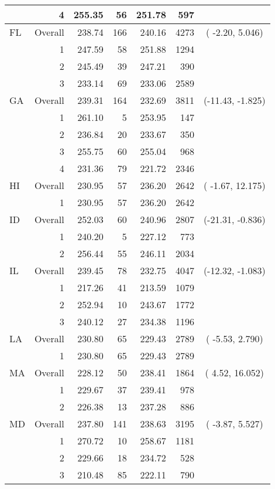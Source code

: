 \begin{longtable}{lrrr@{\extracolsep{.25cm}}rrc}
   & 4 & 255.35 &  56 & 251.78 & 597 &  \\ 
   \hline
FL & Overall & 238.74 & 166 & 240.16 & 4273 & ( -2.20,  5.046) \\ 
   & 1 & 247.59 &  58 & 251.88 & 1294 &  \\ 
   & 2 & 245.49 &  39 & 247.21 & 390 &  \\ 
   & 3 & 233.14 &  69 & 233.06 & 2589 &  \\ 
   \hline
GA & Overall & 239.31 & 164 & 232.69 & 3811 & (-11.43, -1.825) \\ 
   & 1 & 261.10 &   5 & 253.95 & 147 &  \\ 
   & 2 & 236.84 &  20 & 233.67 & 350 &  \\ 
   & 3 & 255.75 &  60 & 255.04 & 968 &  \\ 
   & 4 & 231.36 &  79 & 221.72 & 2346 &  \\ 
   \hline
HI & Overall & 230.95 &  57 & 236.20 & 2642 & ( -1.67, 12.175) \\ 
   & 1 & 230.95 &  57 & 236.20 & 2642 &  \\ 
   \hline
ID & Overall & 252.03 &  60 & 240.96 & 2807 & (-21.31, -0.836) \\ 
   & 1 & 240.20 &   5 & 227.12 & 773 &  \\ 
   & 2 & 256.44 &  55 & 246.11 & 2034 &  \\ 
   \hline
IL & Overall & 239.45 &  78 & 232.75 & 4047 & (-12.32, -1.083) \\ 
   & 1 & 217.26 &  41 & 213.59 & 1079 &  \\ 
   & 2 & 252.94 &  10 & 243.67 & 1772 &  \\ 
   & 3 & 240.12 &  27 & 234.38 & 1196 &  \\ 
   \hline
LA & Overall & 230.80 &  65 & 229.43 & 2789 & ( -5.53,  2.790) \\ 
   & 1 & 230.80 &  65 & 229.43 & 2789 &  \\ 
   \hline
MA & Overall & 228.12 &  50 & 238.41 & 1864 & (  4.52, 16.052) \\ 
   & 1 & 229.67 &  37 & 239.41 & 978 &  \\ 
   & 2 & 226.38 &  13 & 237.28 & 886 &  \\ 
   \hline
MD & Overall & 237.80 & 141 & 238.63 & 3195 & ( -3.87,  5.527) \\ 
   & 1 & 270.72 &  10 & 258.67 & 1181 &  \\ 
   & 2 & 229.66 &  18 & 234.72 & 528 &  \\ 
   & 3 & 210.48 &  85 & 222.11 & 790 &  \\ 

\end{longtable}
